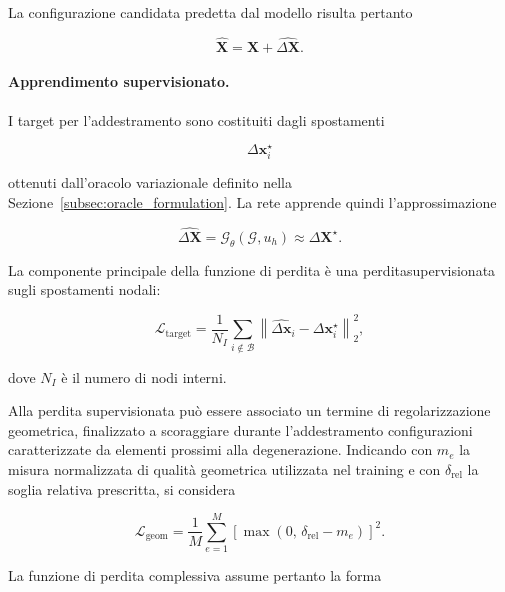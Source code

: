 La configurazione candidata predetta dal modello risulta pertanto

\begin{equation}
\widehat{\mathbf{X}}
=
\mathbf{X}
+
\widehat{\Delta\mathbf{X}}.
\label{eq:predicted_mesh}
\end{equation}

\paragraph{Apprendimento supervisionato.}

I target per l'addestramento sono costituiti dagli spostamenti

\[
\Delta\mathbf{x}_i^\star
\]

ottenuti dall'oracolo variazionale definito nella Sezione~\ref{subsec:oracle_formulation}. La rete apprende quindi l'approssimazione

\begin{equation}
\widehat{\Delta\mathbf{X}}
=
\mathcal{G}_{\theta}
\left(
\mathcal{G},
u_h
\right)
\approx
\Delta\mathbf{X}^{\star}.
\label{eq:gnn_mapping}
\end{equation}

La componente principale della funzione di perdita è una perditasupervisionata sugli spostamenti nodali:

\begin{equation}
\mathcal{L}_{\mathrm{target}}
=
\frac{1}{N_I}
\sum_{i\notin\mathcal{B}}
\left\|
\widehat{\Delta\mathbf{x}}_i
-
\Delta\mathbf{x}_i^\star
\right\|_2^2,
\label{eq:target_loss}
\end{equation}

dove $N_I$ è il numero di nodi interni.

Alla perdita supervisionata può essere associato un termine di regolarizzazione geometrica, finalizzato a scoraggiare durante l'addestramento configurazioni caratterizzate da elementi prossimi alla degenerazione. Indicando con $m_e$ la misura normalizzata di qualità geometrica utilizzata nel training e con $\delta_{\mathrm{rel}}$ la soglia relativa prescritta, si considera

\begin{equation}
\mathcal{L}_{\mathrm{geom}}
=
\frac{1}{M}
\sum_{e=1}^{M}
\left[
\max
\left(
0,\,
\delta_{\mathrm{rel}}-m_e
\right)
\right]^2.
\label{eq:geometric_loss}
\end{equation}

La funzione di perdita complessiva assume pertanto la forma

